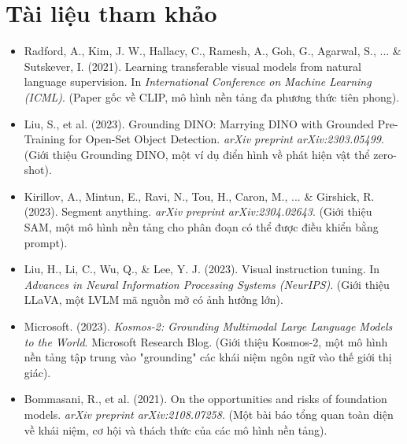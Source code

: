 \section*{Tài liệu tham khảo}
\begin{itemize}
	\item[1] Radford, A., Kim, J. W., Hallacy, C., Ramesh, A., Goh, G., Agarwal, S., ... \& Sutskever, I. (2021). Learning transferable visual models from natural language supervision. In \textit{International Conference on Machine Learning (ICML)}. (Paper gốc về CLIP, mô hình nền tảng đa phương thức tiên phong).
	\item[2] Liu, S., et al. (2023). Grounding DINO: Marrying DINO with Grounded Pre-Training for Open-Set Object Detection. \textit{arXiv preprint arXiv:2303.05499}. (Giới thiệu Grounding DINO, một ví dụ điển hình về phát hiện vật thể zero-shot).
	\item[3] Kirillov, A., Mintun, E., Ravi, N., Tou, H., Caron, M., ... \& Girshick, R. (2023). Segment anything. \textit{arXiv preprint arXiv:2304.02643}. (Giới thiệu SAM, một mô hình nền tảng cho phân đoạn có thể được điều khiển bằng prompt).
	\item[4] Liu, H., Li, C., Wu, Q., \& Lee, Y. J. (2023). Visual instruction tuning. In \textit{Advances in Neural Information Processing Systems (NeurIPS)}. (Giới thiệu LLaVA, một LVLM mã nguồn mở có ảnh hưởng lớn).
	\item[5] Microsoft. (2023). \textit{Kosmos-2: Grounding Multimodal Large Language Models to the World}. Microsoft Research Blog. (Giới thiệu Kosmos-2, một mô hình nền tảng tập trung vào "grounding" các khái niệm ngôn ngữ vào thế giới thị giác).
	\item[6] Bommasani, R., et al. (2021). On the opportunities and risks of foundation models. \textit{arXiv preprint arXiv:2108.07258}. (Một bài báo tổng quan toàn diện về khái niệm, cơ hội và thách thức của các mô hình nền tảng).
\end{itemize}